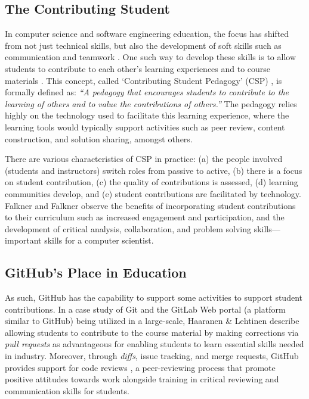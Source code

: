 \subsection{The Contributing Student}
In computer science and software engineering education, the focus has shifted from not just technical skills, but also the development of soft skills such as communication and teamwork \cite{jazayeri2004education}. One such way to develop these skills is to allow students to contribute to each other's learning experiences and to course materials \cite{hamer2006some}. This concept, called `Contributing Student Pedagogy' (CSP) \cite{hamer2008contributing}, is formally defined as: \textit{``A pedagogy that encourages students to contribute to the learning of others and to value the contributions of others.''} The pedagogy relies highly on the technology used to facilitate this learning experience, where the learning tools would typically support activities such as peer review, content construction, and solution sharing, amongst others.

There are various characteristics of CSP in practice: (a) the people involved (students and instructors) switch roles from passive to active, (b) there is a focus on student contribution, (c) the quality of contributions is assessed, (d) learning communities develop, and (e) student contributions are facilitated by technology. Falkner and Falkner \cite{falkner2012supporting} observe the benefits of incorporating student contributions to their curriculum such as increased engagement and participation, and the development of critical analysis, collaboration, and problem solving skills---important skills for a computer scientist.

\subsection{GitHub's Place in Education}
As such, GitHub has the capability to support some activities to support student contributions. In a case study of Git and the GitLab Web portal (a platform similar to GitHub) being utilized in a large-scale, Haaranen \& Lehtinen \cite{haaranen2015teaching} describe allowing students to contribute to the course material by making corrections via \emph{pull requests} as advantageous for enabling students to learn essential skills needed in industry. Moreover, through \emph{diffs}, issue tracking, and merge requests, GitHub provides support for code reviews \cite{Kalliamvakou}, a peer-reviewing process that promote positive attitudes towards work alongside training in critical reviewing and communication skills \cite{HundhausenAgrawalAgarwal} for students.


